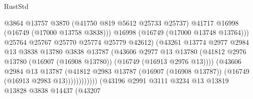 \begin{lexlean}{RustStd}
\begin{coremodule}
                                              @3864
                                              @13757
                                              @3870
                                              (@41750 @819 @5612 @25733 @25737)
                                              @41717
                                              @16998
                                              (@16749 (@17000 @13758 @3838)))
                                            @16998
                                            (@16749 (@17000 @13748 @13764)))
                                          @25764
                                          @25767
                                          @25770
                                          @25774
                                          @25779
                                          @42612)
                                        (@43261
                                          @13774
                                          @2977
                                          @2984
                                          @13
                                          @3838
                                          @13780
                                          @3838
                                          @13787
                                          (@43606
                                            @2977
                                            @13
                                            @13780
                                            (@41812
                                              @2976
                                              @13780
                                              (@16907 (@16908 @13780))
                                              (@16749 (@16913 @2976 @13))))
                                          (@43606
                                            @2984
                                            @13
                                            @13787
                                            (@41812
                                              @2983
                                              @13787
                                              (@16907 (@16908 @13787))
                                              (@16749 (@16913 @2983 @13))))))))))))
                          (@43196
                            @2991
                            @3111
                            @3234
                            @13
                            @13819
                            @13828
                            @3838
                            @14437
                            (@43207

\end{coremodule}
\end{lexlean}
